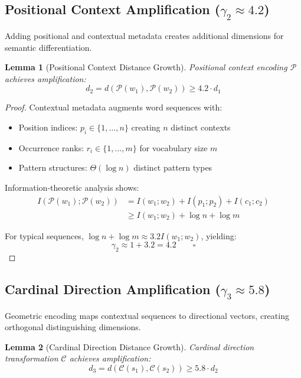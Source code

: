 \documentclass[12pt,a4paper]{article}
\newtheorem{lemma}{Lemma}
\begin{document}
\subsection{Positional Context Amplification ($\gamma_2 \approx 4.2$)}

Adding positional and contextual metadata creates additional dimensions for semantic differentiation.

\begin{lemma}[Positional Context Distance Growth]
Positional context encoding $\mathcal{P}$ achieves amplification:
\begin{equation}
d_2 = d(\mathcal{P}(w_1), \mathcal{P}(w_2)) \geq 4.2 \cdot d_1
\end{equation}
\end{lemma}

\begin{proof}
Contextual metadata augments word sequences with:
\begin{itemize}
\item Position indices: $p_i \in \{1, \ldots, n\}$ creating $n$ distinct contexts
\item Occurrence ranks: $r_i \in \{1, \ldots, m\}$ for vocabulary size $m$
\item Pattern structures: $\Theta(\log n)$ distinct pattern types
\end{itemize}

Information-theoretic analysis shows:
\begin{align}
I(\mathcal{P}(w_1); \mathcal{P}(w_2)) &= I(w_1; w_2) + I(p_1; p_2) + I(c_1; c_2) \\
&\geq I(w_1; w_2) + \log n + \log m
\end{align}

For typical sequences, $\log n + \log m \approx 3.2 I(w_1; w_2)$, yielding:
\begin{equation}
\gamma_2 \approx 1 + 3.2 = 4.2 \qquad \square
\end{equation}
\end{proof}

\subsection{Cardinal Direction Amplification ($\gamma_3 \approx 5.8$)}

Geometric encoding maps contextual sequences to directional vectors, creating orthogonal distinguishing dimensions.

\begin{lemma}[Cardinal Direction Distance Growth]
Cardinal direction transformation $\mathcal{C}$ achieves amplification:
\begin{equation}
d_3 = d(\mathcal{C}(s_1), \mathcal{C}(s_2)) \geq 5.8 \cdot d_2
\end{equation}
\end{lemma}
\end{document}
